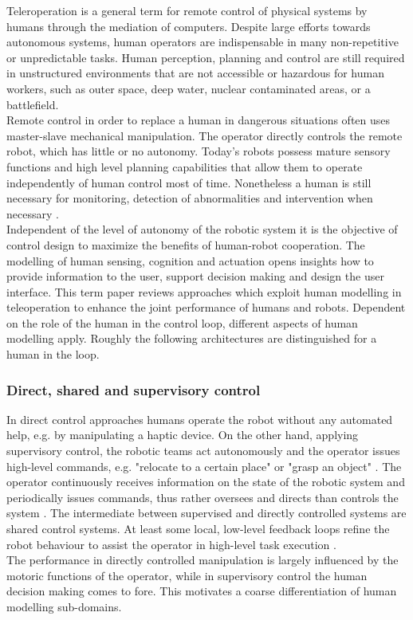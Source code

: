 \documentclass[a4paper,twoside, openright,12pt]{report}
\begin{document}
Teleroperation is a general term for remote control of physical systems by humans through the mediation of computers. Despite large efforts towards autonomous systems, human operators are indispensable in many non-repetitive or unpredictable tasks. Human perception, planning and control are still required in unstructured environments that are not accessible or hazardous for human workers, such as outer space, deep water, nuclear contaminated areas, or a battlefield.\\
Remote control in order to replace a human in dangerous situations often uses master-slave mechanical manipulation. The operator directly controls the remote robot, which has little or no autonomy. Today's robots possess mature sensory functions and high level planning capabilities that allow them to operate independently of human control most of time. Nonetheless a human is still necessary for monitoring, detection of abnormalities and intervention when necessary \cite{Sheridian94}.\\
Independent of the level of autonomy of the robotic system it is the objective of control design to maximize the benefits of human-robot cooperation. The modelling of human sensing, cognition and actuation opens insights how to provide information to the user, support decision making and design the user interface. This term paper reviews approaches which exploit human modelling in teleoperation to enhance the joint performance of humans and robots.
Dependent on the role of the human in the control loop, different aspects of human modelling apply. Roughly the following architectures are distinguished for a human in the loop.

\subsubsection{Direct, shared and supervisory control} 
In direct control approaches humans operate the robot without any automated help, e.g. by manipulating a haptic device. On the other hand, applying supervisory control, the robotic teams act autonomously and the operator issues high-level commands, e.g. "relocate to a certain place" or "grasp an object" \cite{Peters_15}. The operator continuously receives information on the state of the robotic system and periodically issues commands, thus rather oversees and directs than controls the system \cite{Sheridian94}.
The intermediate between supervised and directly controlled systems are shared control systems. At least some local, low-level feedback loops refine the robot behaviour to assist the operator in high-level task execution \cite{TeleoperationHandbook}.\\
The performance in directly controlled manipulation is largely influenced by the motoric functions of the operator, while in supervisory control the human decision making comes to fore. This motivates a coarse differentiation of human modelling sub-domains. 
\end{document}
